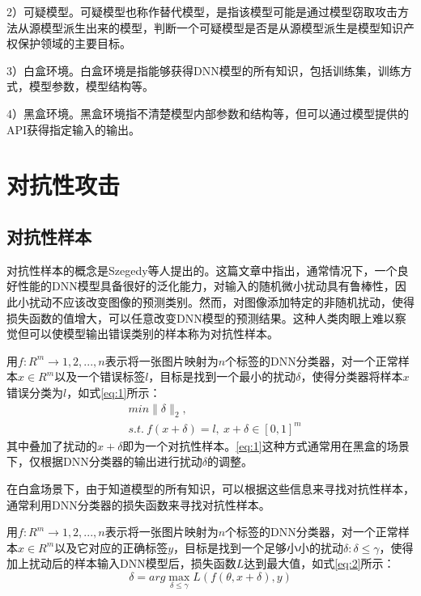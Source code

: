 2）可疑模型。可疑模型也称作替代模型，是指该模型可能是通过模型窃取攻击方法从源模型派生出来的模型，判断一个可疑模型是否是从源模型派生是模型知识产权保护领域的主要目标。

3）白盒环境。白盒环境是指能够获得DNN模型的所有知识，包括训练集，训练方式，模型参数，模型结构等。

4）黑盒环境。黑盒环境指不清楚模型内部参数和结构等，但可以通过模型提供的API获得指定输入的输出。




\section{对抗性攻击}

\subsection{对抗性样本}
 
对抗性样本的概念是Szegedy等人\cite{szegedy2013intriguing}提出的。这篇文章中指出，通常情况下，一个良好性能的DNN模型具备很好的泛化能力，对输入的随机微小扰动具有鲁棒性，因此小扰动不应该改变图像的预测类别。然而，对图像添加特定的非随机扰动，使得损失函数的值增大，可以任意改变DNN模型的预测结果。这种人类肉眼上难以察觉但可以使模型输出错误类别的样本称为对抗性样本。 

用$f:R^m \rightarrow {1,2,...,n}$表示将一张图片映射为$n$个标签的DNN分类器，对一个正常样本$x \in R^m$以及一个错误标签$l$，目标是找到一个最小的扰动$\delta$，使得分类器将样本$x$错误分类为$l$，如式\ref{eq:1}所示：
\begin{equation}
	\label{eq:1}
	\begin{split}
	&min\parallel \delta \parallel_2, \\
	 &s.t. \ f(x + \delta) = l,\ x + \delta \in [0,1]^m
	\end{split}
\end{equation}
其中叠加了扰动的$x +\delta$即为一个对抗性样本。\ref{eq:1}这种方式通常用在黑盒的场景下，仅根据DNN分类器的输出进行扰动$\delta$的调整。
 
 在白盒场景下，由于知道模型的所有知识，可以根据这些信息来寻找对抗性样本，通常利用DNN分类器的损失函数来寻找对抗性样本。
 
 用$f:R^m \rightarrow {1,2,...,n}$表示将一张图片映射为$n$个标签的DNN分类器，对一个正常样本$x \in R^m$以及它对应的正确标签$y$，目标是找到一个足够小小的扰动$\delta:\delta \leq \gamma$，使得加上扰动后的样本输入DNN模型后，损失函数$L$达到最大值，如式\ref{eq:2}所示：
 \begin{equation}
 	\label{eq:2}
 		\delta = arg \mathop{max} \limits_{\delta \leq \gamma} L(f(\theta, x + \delta), y)
\end{equation}

